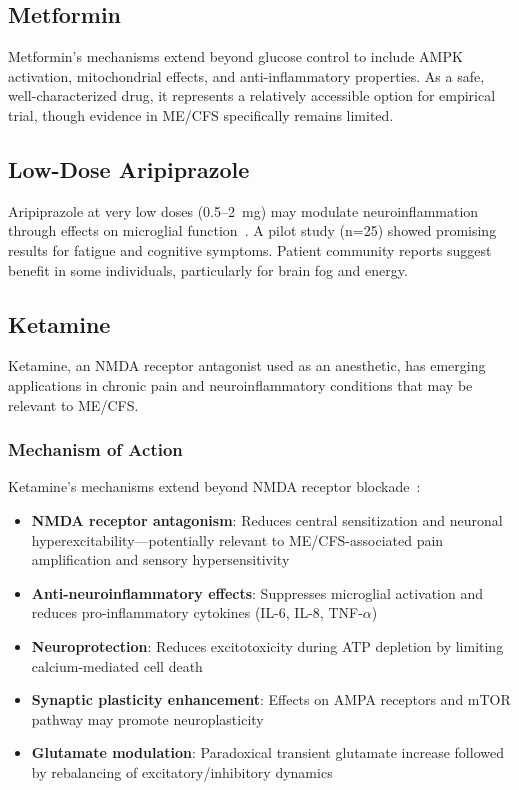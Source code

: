 \subsection{Metformin}

Metformin's mechanisms extend beyond glucose control to include AMPK activation, mitochondrial effects, and anti-inflammatory properties. As a safe, well-characterized drug, it represents a relatively accessible option for empirical trial, though evidence in ME/CFS specifically remains limited.

\subsection{Low-Dose Aripiprazole}

Aripiprazole at very low doses (0.5--2~mg) may modulate neuroinflammation through effects on microglial function~\cite{Crosby2021LDA}. A pilot study (n=25) showed promising results for fatigue and cognitive symptoms. Patient community reports suggest benefit in some individuals, particularly for brain fog and energy.

\subsection{Ketamine}
\label{subsec:ketamine}

Ketamine, an NMDA receptor antagonist used as an anesthetic, has emerging applications in chronic pain and neuroinflammatory conditions that may be relevant to ME/CFS.

\subsubsection{Mechanism of Action}

Ketamine's mechanisms extend beyond NMDA receptor blockade~\cite{Koutsaliaris2025KetamineNeuro}:
\begin{itemize}
    \item \textbf{NMDA receptor antagonism}: Reduces central sensitization and neuronal hyperexcitability---potentially relevant to ME/CFS-associated pain amplification and sensory hypersensitivity
    \item \textbf{Anti-neuroinflammatory effects}: Suppresses microglial activation and reduces pro-inflammatory cytokines (IL-6, IL-8, TNF-$\alpha$)
    \item \textbf{Neuroprotection}: Reduces excitotoxicity during ATP depletion by limiting calcium-mediated cell death
    \item \textbf{Synaptic plasticity enhancement}: Effects on AMPA receptors and mTOR pathway may promote neuroplasticity
    \item \textbf{Glutamate modulation}: Paradoxical transient glutamate increase followed by rebalancing of excitatory/inhibitory dynamics
\end{itemize}

